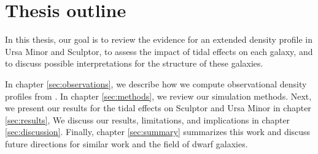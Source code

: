 \section{Thesis outline}\label{thesis-outline}

In this thesis, our goal is to review the evidence for an extended
density profile in Ursa Minor and Sculptor, to assess the impact of
tidal effects on each galaxy, and to discuss possible interpretations
for the structure of these galaxies.

In chapter \ref{sec:observations}, we describe how we compute
observational density profiles from \citet{jensen+2024}. In chapter
\ref{sec:methods}, we review our simulation methods. Next, we present
our results for the tidal effects on Sculptor and Ursa Minor in chapter
\ref{sec:results}, We discuss our results, limitations, and implications
in chapter \ref{sec:discussion}. Finally, chapter \ref{sec:summary}
summarizes this work and discuss future directions for similar work and
the field of dwarf galaxies.
